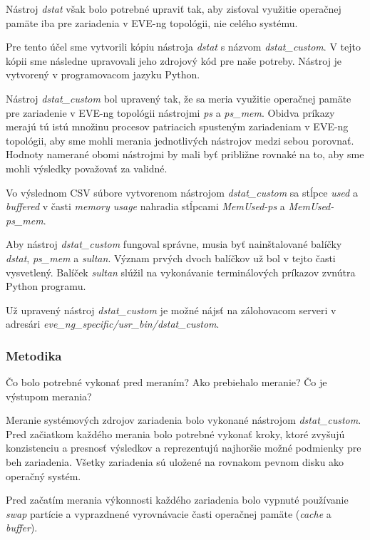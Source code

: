 Nástroj \emph{dstat} však bolo potrebné upraviť tak, aby zisťoval využitie operačnej pamäte iba pre zariadenia v EVE-ng topológii, nie celého systému.

Pre tento účel sme vytvorili kópiu nástroja \emph{dstat} s názvom \emph{dstat\_custom}. V tejto kópii sme následne upravovali jeho zdrojový kód pre naše potreby. Nástroj je vytvorený v programovacom jazyku Python.

Nástroj \emph{dstat\_custom} bol upravený tak, že sa meria využitie operačnej pamäte pre zariadenie v EVE-ng topológii nástrojmi \emph{ps} a \emph{ps\_mem}. Obidva príkazy merajú tú istú množinu procesov patriacich spusteným zariadeniam v EVE-ng topológii, aby sme mohli merania jednotlivých nástrojov medzi sebou porovnať. Hodnoty namerané obomi nástrojmi by mali byť približne rovnaké na to, aby sme mohli výsledky považovať za validné.

Vo výslednom CSV súbore vytvorenom nástrojom \emph{dstat\_custom} sa stĺpce \emph{used} a \emph{buffered} v časti \emph{memory usage} nahradia stĺpcami \emph{MemUsed-ps} a \emph{MemUsed-ps\_mem}.

Aby nástroj \emph{dstat\_custom} fungoval správne, musia byť nainštalované balíčky \emph{dstat}, \emph{ps\_mem} a \emph{sultan}. Význam prvých dvoch balíčkov už bol v tejto časti vysvetlený. Balíček \emph{sultan} slúžil na vykonávanie terminálových príkazov zvnútra Python programu.

Už upravený nástroj \emph{dstat\_custom} je možné nájsť na zálohovacom serveri v adresári \emph{eve\_ng\_specific/usr\_bin/dstat\_custom}.





\subsubsection{Metodika}

Čo bolo potrebné vykonať pred meraním?
Ako prebiehalo meranie?
Čo je výstupom merania?

Meranie systémových zdrojov zariadenia bolo vykonané nástrojom \emph{dstat\_custom}. Pred začiatkom každého merania bolo potrebné vykonať kroky, ktoré zvyšujú konzistenciu a presnosť výsledkov a reprezentujú najhoršie možné podmienky pre beh zariadenia. Všetky zariadenia sú uložené na rovnakom pevnom disku ako operačný systém.

Pred začatím merania výkonnosti každého zariadenia bolo vypnuté používanie \emph{swap} partície a vyprazdnené vyrovnávacie časti operačnej pamäte (\emph{cache} a \emph{buffer}).


